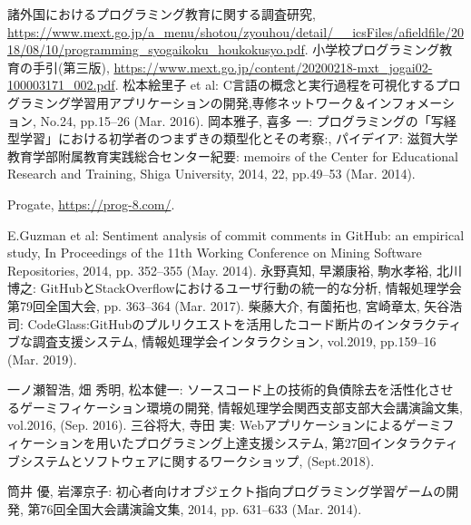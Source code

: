 \begin{thebibliography}{99}
	
	諸外国におけるプログラミング教育に関する調査研究, \url{https://www.mext.go.jp/a_menu/shotou/zyouhou/detail/__icsFiles/afieldfile/2018/08/10/programming_syogaikoku_houkokusyo.pdf}.
	小学校プログラミング教育の手引(第三版), \url{https://www.mext.go.jp/content/20200218-mxt_jogai02-100003171_002.pdf}.
	松本絵里子 et al: C言語の概念と実行過程を可視化するプログラミング学習用アプリケーションの開発,専修ネットワーク＆インフォメーション, No.24, pp.15--26 (Mar. 2016).
	岡本雅子, 喜多 一: プログラミングの「写経型学習」における初学者のつまずきの類型化とその考察:, パイデイア: 滋賀大学教育学部附属教育実践総合センター紀要: memoirs of the Center for Educational Research and Training, Shiga University, 2014, 22, pp.49--53 (Mar. 2014).
	
	Progate, \url{https://prog-8.com/}.

	E.Guzman et al: Sentiment analysis of commit comments in GitHub: an empirical study, In Proceedings of the 11th Working Conference on Mining Software Repositories, 2014, pp. 352--355 (May. 2014).
	永野真知, 早瀬康裕, 駒水孝裕, 北川博之: GitHubとStackOverflowにおけるユーザ行動の統一的な分析, 情報処理学会第79回全国大会, pp. 363–364 (Mar. 2017).
	柴藤大介, 有薗拓也, 宮崎章太, 矢谷浩司: CodeGlass:GitHubのプルリクエストを活用したコード断片のインタラクティブな調査支援システム, 情報処理学会インタラクション, vol.2019, pp.159–16 (Mar. 2019).

	一ノ瀬智浩, 畑 秀明, 松本健一: ソースコード上の技術的負債除去を活性化させるゲーミフィケーション環境の開発, 情報処理学会関西支部支部大会講演論文集, vol.2016, (Sep. 2016).
	三谷将大, 寺田 実: Webアプリケーションによるゲーミフィケーションを用いたプログラミング上達支援システム, 第27回インタラクティブシステムとソフトウェアに関するワークショップ, (Sept.2018).

	筒井 優, 岩澤京子: 初心者向けオブジェクト指向プログラミング学習ゲームの開発, 第76回全国大会講演論文集, 2014, pp. 631--633 (Mar. 2014).



\end{thebibliography}
